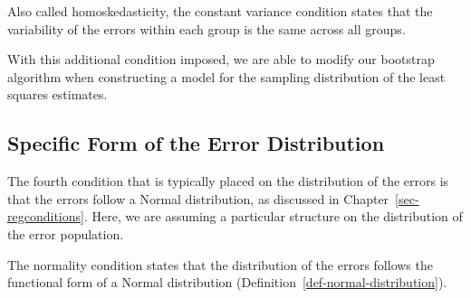 \documentclass[
  letterpaper,
  DIV=11,
  numbers=noendperiod]{scrreprt}
\theoremstyle{plain}
\theoremstyle{definition}
\theoremstyle{definition}
\theoremstyle{remark}
\begin{document}
\begin{tcolorbox}[enhanced jigsaw, breakable, titlerule=0mm, colframe=quarto-callout-note-color-frame, bottomtitle=1mm, opacityback=0, rightrule=.15mm, toptitle=1mm, arc=.35mm, bottomrule=.15mm, left=2mm, title=\textcolor{quarto-callout-note-color}{\faInfo}\hspace{0.5em}{Constant Variance}, leftrule=.75mm, coltitle=black, toprule=.15mm, colbacktitle=quarto-callout-note-color!10!white, colback=white, opacitybacktitle=0.6]

Also called homoskedasticity, the constant variance condition states
that the variability of the errors within each group is the same across
all groups.

\end{tcolorbox}

With this additional condition imposed, we are able to modify our
bootstrap algorithm when constructing a model for the sampling
distribution of the least squares estimates.

\subsection{Specific Form of the Error
Distribution}\label{specific-form-of-the-error-distribution-2}

The fourth condition that is typically placed on the distribution of the
errors is that the errors follow a Normal distribution, as discussed in
Chapter~\ref{sec-regconditions}. Here, we are assuming a particular
structure on the distribution of the error population.

\begin{tcolorbox}[enhanced jigsaw, breakable, titlerule=0mm, colframe=quarto-callout-note-color-frame, bottomtitle=1mm, opacityback=0, rightrule=.15mm, toptitle=1mm, arc=.35mm, bottomrule=.15mm, left=2mm, title=\textcolor{quarto-callout-note-color}{\faInfo}\hspace{0.5em}{Normality}, leftrule=.75mm, coltitle=black, toprule=.15mm, colbacktitle=quarto-callout-note-color!10!white, colback=white, opacitybacktitle=0.6]

The normality condition states that the distribution of the errors
follows the functional form of a Normal distribution
(Definition~\ref{def-normal-distribution}).

\end{tcolorbox}
\end{document}
